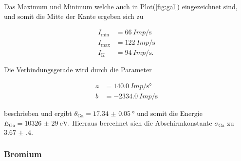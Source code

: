             \noindent Das Maximum und Minimum welche auch in Plot(\ref{fig:gal}) eingezeichnet sind, und somit die Mitte der Kante ergeben sich 
            zu

            \begin{align*}
                I_{\text{min}} &= \SI{66}{Imp\per\second}\\
                I_{\text{max}} &= \SI{122}{Imp\per\second}\\
                I_{\text{K}} &= \SI{94}{Imp\per\second} .
            \end{align*}

            \noindent Die Verbindungsgerade wird durch die Parameter 

            \begin{align*}
                a & = \SI{140.0}{Imp\per\second\degree}\\
                b & = \SI{-2334.0}{Imp\per\second}
            \end{align*}

            \noindent beschrieben und ergibt $\theta_{\text{Ga}} = \SI{17.34(5)}{\degree}$ und somit die Energie $E_{\text{Ga}} = \SI{10326(29)}{\electronvolt}$. 
            Hierraus berechnet sich die Abschirmkonstante $\sigma_{\text{Ga}}$ zu $ \num{3.67(40)}$.
      
    \subsubsection{Bromium}
            
